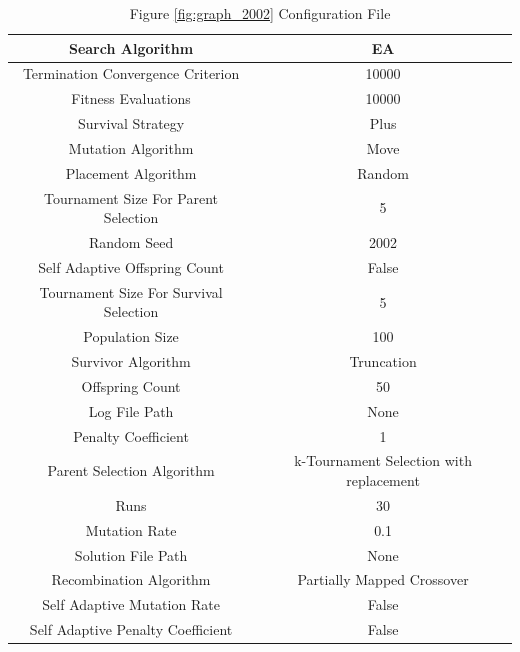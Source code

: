 \documentclass{standalone}
\begin{document}
\begin{table}[!htb]
	\centering
	\caption{Figure \ref{fig:graph_2002} Configuration File}
	\label{tab:graph_2002}
	\begin{tabular}{| c | c |}
		\hline
		Search Algorithm		& EA		 \\
		\hline
		Termination Convergence Criterion		& 10000		 \\
		\hline
		Fitness Evaluations		& 10000		 \\
		\hline
		Survival Strategy		& Plus		 \\
		\hline
		Mutation Algorithm		& Move		 \\
		\hline
		Placement Algorithm		& Random		 \\
		\hline
		Tournament Size For Parent Selection		& 5		 \\
		\hline
		Random Seed		& 2002		 \\
		\hline
		Self Adaptive Offspring Count		& False		 \\
		\hline
		Tournament Size For Survival Selection		& 5		 \\
		\hline
		Population Size		& 100		 \\
		\hline
		Survivor Algorithm		& Truncation		 \\
		\hline
		Offspring Count		& 50		 \\
		\hline
		Log File Path		& None		 \\
		\hline
		Penalty Coefficient		& 1		 \\
		\hline
		Parent Selection Algorithm		& k-Tournament Selection with replacement		 \\
		\hline
		Runs		& 30		 \\
		\hline
		Mutation Rate		& 0.1		 \\
		\hline
		Solution File Path		& None		 \\
		\hline
		Recombination Algorithm		& Partially Mapped Crossover		 \\
		\hline
		Self Adaptive Mutation Rate		& False		 \\
		\hline
		Self Adaptive Penalty Coefficient		& False		 \\
		\hline
	\end{tabular}
\end{table}
\end{document}

